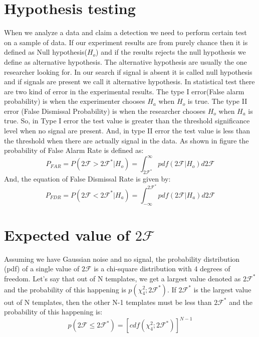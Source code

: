 \documentclass{ttuthes2007}
\begin{document}
\section{Hypothesis testing}                                                    
        When we analyze a data and claim a detection we need to perform certain
test on a sample of data. If our experiment results are from purely chance then
it is defined as Null hypothesis($H_o$) and if the results rejects the null
hypothesis we define as alternative hypothesis. The alternative hypothesis are
usually the one researcher looking for.  In our search if signal is absent it is
called null hypothesis and if signals are present we call it alternative
hypothesis.
	In statistical test there are two kind of error in the experimental
results. The type I error(False alarm probability) is when the experimenter
chooses $H_a$ when $H_o$ is true.  The type II error (False Dismissal
Probability) is when the researcher chooses $H_o$ when $H_a$ is true.  So, in
Type I error the test value is greater than the threshold significance level
when no signal are present. And, in type II error the test value is less than
the threshold when there are actually signal in the data.
As shown in figure the probability of False Alarm Rate is defined as:
\begin{equation}
P_{FAR}=P(2\mathcal{F}>2\mathcal{F}^*|H_o)=\int_{2\mathcal{F}^*}^\infty
pdf(2\mathcal{F}|H_o)d2\mathcal{F}
\end{equation}
And, the equation of False Dismissal Rate is given by:
\begin{equation}
P_{FDR}=P(2\mathcal{F}<2\mathcal{F}^*|H_a)=\int_{-\infty}^{2\mathcal{F}^*}
pdf(2\mathcal{F}|H_a)d2\mathcal{F}
\end{equation}



\section{Expected value of $2\mathcal{F}$}
Assuming we have Gaussian noise and no signal, the probability distribution
(pdf) of a single value of $2\mathcal{F}$ is a chi-square distribution with 4
degrees of freedom.  Let's say that out of N templates, we get a largest value
denoted as $2\mathcal{F}^*$ and the probability of this happening is
$p(\chi^2_4;2\mathcal{F}^*)$. If $2\mathcal{F}^*$ is the largest value out of N
templates, then the other N-1 templates must be less than $2\mathcal{F}^*$ and
the probability of this happening is:
\begin{equation}
p(2\mathcal{F}\leq2\mathcal{F}^*)= [cdf(\chi^2_4;2\mathcal{F}^*)]^{N-1}
\end{equation} 
\end{document}
